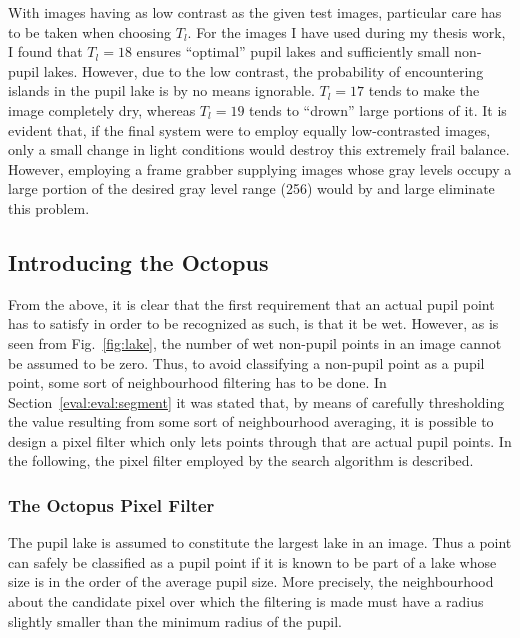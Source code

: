 With images having as low contrast as the given test images,
particular care has to be taken when choosing $T_{l}$.  For the images
I have used during my thesis work, I found that $T_{l}=18$ ensures
``optimal'' pupil lakes and sufficiently small non-pupil lakes.
However, due to the low contrast, the probability of encountering
islands in the pupil lake is by no means ignorable.  $T_{l}=17$ tends
to make the image completely dry, whereas $T_{l}=19$ tends to
``drown'' large portions of it.  It is evident that, if the final
system were to employ equally low-contrasted images, only a small
change in light conditions would destroy this extremely frail balance.
However, employing a frame grabber supplying images whose gray levels
occupy a large portion of the desired gray level range (256) would by
and large eliminate this problem.


\subsection{Introducing the Octopus}
\label{algo:seek:octopus}

From the above, it is clear that the first requirement that an actual
pupil point has to satisfy in order to be recognized as such, is that
it be wet.  However, as is seen from Fig.~\ref{fig:lake}, the number
of wet non-pupil points in an image cannot be assumed to be zero.
Thus, to avoid classifying a non-pupil point as a pupil point, some
sort of neighbourhood filtering has to be done.  In
Section~\ref{eval:eval:segment} it was stated that, by means of
carefully thresholding the value resulting from some sort of
neighbourhood averaging, it is possible to design a pixel filter which
only lets points through that are actual pupil points.  In the
following, the pixel filter employed by the search algorithm is
described.

\subsubsection{The Octopus Pixel Filter}

The pupil lake is assumed to constitute the largest lake in an image.
Thus a point can safely be classified as a pupil point if it is known
to be part of a lake whose size is in the order of the average pupil
size.  More precisely, the neighbourhood about the candidate pixel
over which the filtering is made must have a radius slightly smaller
than the minimum radius of the pupil.

